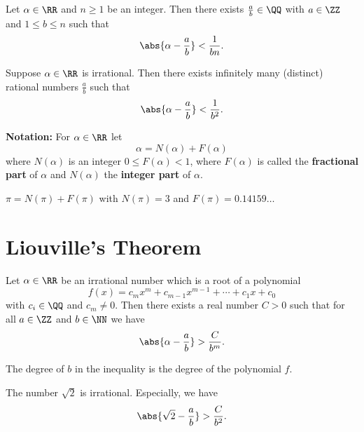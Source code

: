 \documentclass[12pt, a4paper]{article}
\begin{document}
\begin{mdthm}
    Let \(\alpha \in \RR\) and \(n \geq 1\) be an integer. Then there exists \(\frac{a}{b} \in \QQ\) with \(a \in \ZZ\) and \(1 \leq b \leq n\) such that 
    \[\abs{\alpha - \frac{a}{b}}<\frac{1}{bn}.\]
\end{mdthm}

\begin{corollary}
    Suppose \(\alpha \in \RR\) is irrational. Then there exists infinitely many (distinct) rational numbers \(\frac{a}{b}\) such that
    \[\abs{\alpha - \frac{a}{b}} < \frac{1}{b^2}.\]
\end{corollary}

\begin{definition}
    \textbf{Notation:} For \(\alpha \in \RR\) let 
    \[\alpha =N(\alpha)+F(\alpha)\]
    where \(N(\alpha)\) is an integer \(0 \leq F(\alpha)<1\), where \(F(\alpha)\) is called the \textbf{fractional part} of \(\alpha\) and \(N(\alpha)\) the \textbf{integer part} of \(\alpha\).
\end{definition}

\begin{example}
    \(\pi =N(\pi)+F(\pi)\) with \(N(\pi)=3\) and \(F(\pi)=0.14159 \ldots\)
\end{example}

\section{Liouville's Theorem}

\begin{mdthm}
    Let \(\alpha \in \RR\) be an irrational number which is a root of a polynomial
    \[f(x) = c_m x^m+ c_{m-1}x^{m-1} + \cdots + c_1 x+c_0\]
    with \(c_i \in \QQ\) and \(c_m \neq 0\). Then there exists a real number \(C >0\) such that for all \(a \in \ZZ\) and \(b\in \NN\) we have
    \[\abs{\alpha -\frac{a}{b}} >\frac{C}{b^m}.\]
\end{mdthm}

\begin{mdnote}
    The degree of \(b\) in the inequality is the degree of the polynomial \(f\).
\end{mdnote}

\begin{mdthm}
    The number \(\sqrt{2}\) is irrational. Especially, we have 
    \[\abs{\sqrt{2}-\frac{a}{b}} >\frac{C}{b^2}.\]
\end{mdthm}
\end{document}
